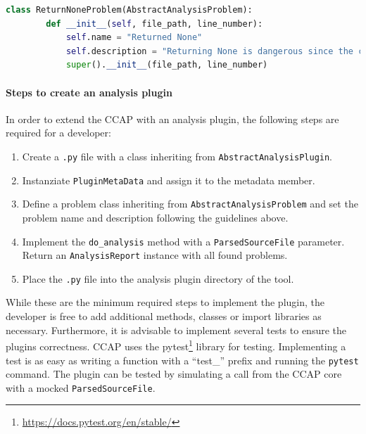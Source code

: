 \begin{lstlisting}[language=Python, label=lst:return_none_problem_override, caption={Example for overwriting the \texttt{AbstractAnalysisProblem} with a concrete implementation. The problem name and description are overwritten.}]
    class ReturnNoneProblem(AbstractAnalysisProblem):
        def __init__(self, file_path, line_number):
            self.name = "Returned None"
            self.description = "Returning None is dangerous since the caller has to check for None. Otherwise, a runtime exception may occur."
            super().__init__(file_path, line_number)
    \end{lstlisting}
    
\paragraph{Steps to create an analysis plugin}
In order to extend the CCAP with an analysis plugin, the following steps are required for a developer:
\begin{enumerate}
    \item Create a \texttt{.py} file with a class inheriting from \texttt{AbstractAnalysisPlugin}.
    \item Instanziate \texttt{PluginMetaData} and assign it to the metadata member.
    \item Define a problem class inheriting from \texttt{AbstractAnalysisProblem} and set the problem name and description following the guidelines above.
    \item Implement the \texttt{do\_analysis} method with a \texttt{ParsedSourceFile} parameter. Return an \texttt{AnalysisReport} instance with all found problems.
    \item Place the \texttt{.py} file into the analysis plugin directory of the tool.
\end{enumerate}
While these are the minimum required steps to implement the plugin, the developer is free to add additional methods, classes or import libraries as necessary.
Furthermore, it is advisable to implement several tests to ensure the plugins correctness. CCAP uses the pytest\footnote{\url{https://docs.pytest.org/en/stable/}} library for testing. Implementing a test is as easy as writing a function with a \enquote{test\_} prefix and running the \texttt{pytest} command. The plugin can be tested by simulating a call from the CCAP core with a mocked \texttt{ParsedSourceFile}. 

